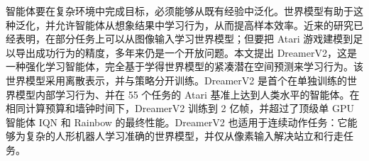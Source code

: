 智能体要在复杂环境中完成目标，必须能够从既有经验中泛化。世界模型有助于这种泛化，并允许智能体从想象结果中学习行为，从而提高样本效率。近来的研究已经表明，在部分任务上可以从图像输入学习世界模型；但要把 Atari 游戏建模到足以导出成功行为的精度，多年来仍是一个开放问题。本文提出 DreamerV2，这是一种强化学习智能体，完全基于学得世界模型的紧凑潜在空间预测来学习行为。该世界模型采用离散表示，并与策略分开训练。DreamerV2 是首个在单独训练的世界模型内部学习行为、并在 55 个任务的 Atari 基准上达到人类水平的智能体。在相同计算预算和墙钟时间下，DreamerV2 训练到 2 亿帧，并超过了顶级单 GPU 智能体 IQN 和 Rainbow 的最终性能。DreamerV2 也适用于连续动作任务：它能够为复杂的人形机器人学习准确的世界模型，并仅从像素输入解决站立和行走任务。

